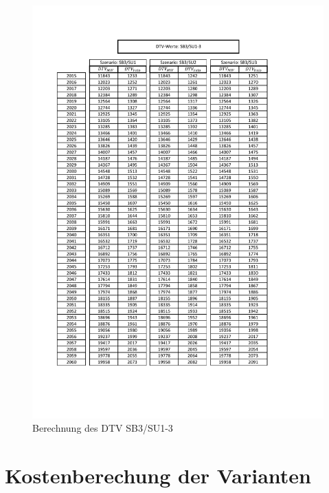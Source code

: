 \begin{figure}[h!]
	\centering
	\includegraphics[width=\textwidth]{figures/Anhang/f-00-10-03-DTV-Modellierung}
	\caption{Berechnung des DTV SB3/SU1-3}
	\label{img:DTVModellierung}
\end{figure}


\section{Kostenberechung der Varianten}
\label{sec:Ahangkostenberechnug}



\printindex



